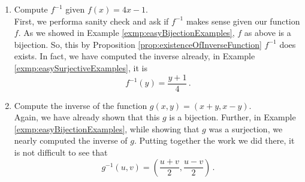 \guard




\begin{exmp}
\label{exmp:easyBijectionExamples}
  \begin{enumerate}
    \item Compute $f^{-1}$ given $f(x) = 4x-1$.\\

    First, we performa sanity check and ask if $f^{-1}$ makes sense given our function $f$.
    As we showed in Example \ref{exmp:easyBijectionExamples}, $f$ as above is a bijection.
    So, this by Proposition \ref{prop:existenceOfInverseFunction} $f^{-1}$ does exists.
    In fact, we have computed the inverse already, in Example \ref{exmp:easySurjectiveExamples}, it is \[ f^{-1}(y) = \frac{y+1}{4}\,.\]

    \item Compute the inverse of the function $g(x,y) = (x+y,x-y)$.\\

    Again, we have already shown that this $g$ is a bijection.
    Further, in Example \ref{exmp:easyBijectionExamples}, while showing that $g$ was a surjection, we nearly computed the inverse of $g$.
    Putting together the work we did there, it is not difficult to see that \[ g^{-1}(u,v) = \left( \frac{ u+v}{2}, \frac{u-v}{2} \right)\,.\]

  \end{enumerate}

\end{exmp}
